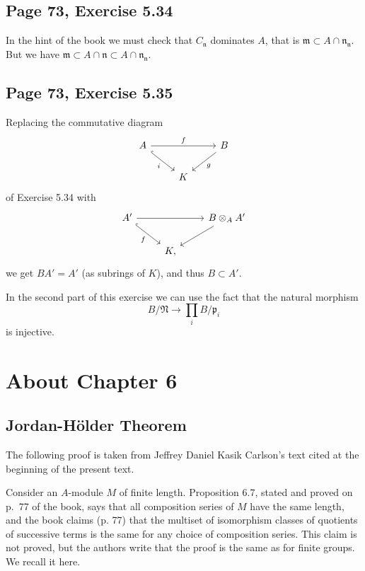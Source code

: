 \documentclass[parskip=half,fontsize=12pt]{scrartcl}%
\newcommand{\mf}{\mathfrak}
\newcommand{\mmm}{\mf m}
\newcommand{\nnn}{\mf n}
\newcommand{\ppp}{\mf p}
\begin{document}
\subsection{Page 73, Exercise 5.34}%

In the hint of the book we must check that $C_\nnn$ dominates $A$, that is $\mmm\subset A\cap\nnn_\nnn$. But we have $\mmm\subset A\cap\nnn\subset A\cap\nnn_\nnn$. %

\subsection{Page 73, Exercise 5.35}%

Replacing the commutative diagram 
$$
\begin{tikzcd}
A\ar[dr,hook,"i"']\ar[rr,"f"]&&B\ar[dl,"g"]\\ 
&K
\end{tikzcd}
$$ 
of Exercise 5.34 with 
$$
\begin{tikzcd}
A'\ar[dr,hook,"f"']\ar[rr]&&B\otimes_AA'\ar[dl]\\ 
&K,
\end{tikzcd}
$$ 
we get $BA'=A'$ (as subrings of $K$), and thus $B\subset A'$.

In the second part of this exercise we can use the fact that the natural morphism 
$$
B/\mf N\to\prod_iB/\ppp_i
$$ 
is injective.

\section{About Chapter 6}%

\subsection{Jordan-Hölder Theorem}%

The following proof is taken from Jeffrey Daniel Kasik Carlson's text cited at the beginning of the present text. 

Consider an $A$-module $M$ of finite length. Proposition 6.7, stated and proved on p.~77 of the book, says that all composition series of $M$ have the same length, and the book claims (p. 77) that the multiset of isomorphism classes of quotients of successive terms is the same for any choice of composition series. This claim is not proved, but the authors write that the proof is the same as for finite groups. We recall it here. 
\end{document}
